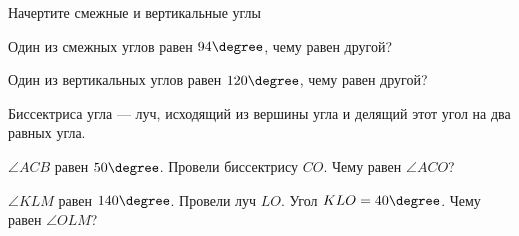 \begin{class}[number=8]
	\begin{listofex}
	 \item Начертите смежные и вертикальные углы
	 \item Один из смежных углов равен \( 94\degree \), чему равен другой?
	 \item Один из вертикальных углов равен \( 120\degree \), чему равен другой?
 	\begin{center}
 		Биссектриса угла --- луч, исходящий из вершины угла и делящий этот угол на два равных угла.
 	\end{center}
 	\item \( \angle ACB \) равен \( 50\degree \). Провели биссектрису \( CO \). Чему равен \( \angle ACO \)?
 	\item \( \angle KLM \) равен \( 140\degree \). Провели луч \( LO \). Угол \( KLO=40\degree \). Чему равен \( \angle OLM \)?
	\end{listofex}
\end{class}
%
